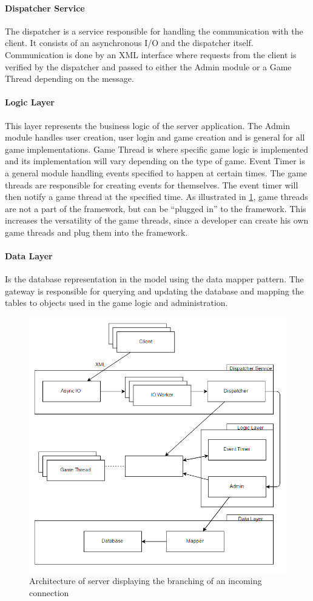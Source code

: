 \paragraph{Dispatcher Service}
The dispatcher is a service responsible for handling the communication with the client. It consists of an asynchronous I/O and the dispatcher itself. Communication is done by an XML interface where requests from the client is verified by the dispatcher and passed to either the Admin module or a Game Thread depending on the message. 

\paragraph{Logic Layer}
This layer represents the business logic of the server application. The Admin module handles user creation, user login and game creation and is general for all game implementations. Game Thread is where specific game logic is implemented and its implementation will vary depending on the type of game. Event Timer is a general module handling events specified to happen at certain times. The game threads are responsible for creating events for themselves. The event timer will then notify a game thread at the specified time. As illustrated in \cref{fig:serverarch}, game threads are not a part of the framework, but can be ``plugged in'' to the framework. This increases the versatility of the game threads, since a developer can create his own game threads and plug them into the framework.

\paragraph{Data Layer}
Is the database representation in the model using the data mapper pattern. The gateway is responsible for querying and updating the database and mapping the tables to objects used in the game logic and administration.

\begin{figure}[H]
  \centering
  \includegraphics[width=\textwidth]{billeder/serverarch.png}  
  \caption{Architecture of server displaying the branching of an incoming connection}
  \label{fig:serverarch}
\end{figure}